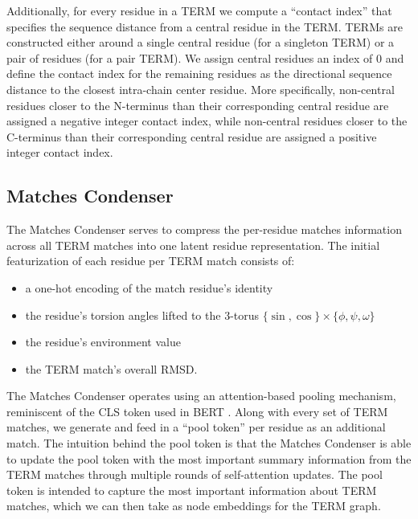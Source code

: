 \documentclass{article}
\begin{document}
Additionally, for every residue in a TERM we compute a ``contact index'' that specifies the sequence distance from a central residue in the TERM. TERMs are constructed either around a single central residue (for a singleton TERM) or a pair of residues (for a pair TERM). We assign central residues an index of 0 and define the contact index for the remaining residues as the directional sequence distance to the closest intra-chain center residue. More specifically, non-central residues closer to the N-terminus than their corresponding central residue are assigned a negative integer contact index, while non-central residues closer to the C-terminus than their corresponding central residue are assigned a positive integer contact index.

\subsection*{Matches Condenser}
The Matches Condenser serves to compress the per-residue matches information across all TERM matches into one latent residue representation. The initial featurization of each residue per TERM match consists of:
\begin{itemize}
    \item a one-hot encoding of the match residue's identity
    \item the residue's torsion angles lifted to the $3$-torus $\{\sin, \cos \} \times \{\phi, \psi, \omega\}$
    \item the residue's environment value
    \item the TERM match's overall RMSD.
\end{itemize}
         
The Matches Condenser operates using an attention-based pooling mechanism, reminiscent of the CLS token used in BERT \citep{Devlin2018}. Along with every set of TERM matches, we generate and feed in a ``pool token'' per residue as an additional match. The intuition behind the pool token is that the Matches Condenser is able to update the pool token with the most important summary information from the TERM matches through multiple rounds of self-attention updates. The pool token is intended to capture the most important information about TERM matches, which we can then take as node embeddings for the TERM graph. 
\end{document}
